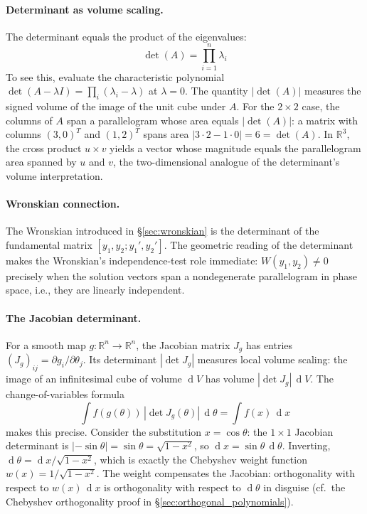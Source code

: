 \documentclass[12pt,a4paper]{report}
\DeclareMathOperator{\deriv}{d}
\theoremstyle{thms}
\theoremstyle{defns}
\begin{document}
\paragraph{Determinant as volume scaling.} The determinant equals the product of the eigenvalues:
\begin{equation}
    \det(A) = \prod_{i=1}^{n} \lambda_i
\end{equation}
To see this, evaluate the characteristic polynomial $\det(A - \lambda I) = \prod_i(\lambda_i - \lambda)$ at $\lambda = 0$. The quantity $|\det(A)|$ measures the signed volume of the image of the unit cube under $A$. For the $2 \times 2$ case, the columns of $A$ span a parallelogram whose area equals $|\det(A)|$: a matrix with columns $(3, 0)^T$ and $(1, 2)^T$ spans area $|3 \cdot 2 - 1 \cdot 0| = 6 = \det(A)$. In $\mathbb{R}^3$, the cross product $u \times v$ yields a vector whose magnitude equals the parallelogram area spanned by $u$ and $v$, the two-dimensional analogue of the determinant's volume interpretation.

\paragraph{Wronskian connection.} The Wronskian introduced in \S\ref{sec:wronskian} is the determinant of the fundamental matrix $[y_1, y_2; y_1', y_2']$. The geometric reading of the determinant makes the Wronskian's independence-test role immediate: $W(y_1, y_2) \neq 0$ precisely when the solution vectors span a nondegenerate parallelogram in phase space, i.e., they are linearly independent.

\paragraph{The Jacobian determinant.} For a smooth map $g: \mathbb{R}^n \to \mathbb{R}^n$, the Jacobian matrix $J_g$ has entries $(J_g)_{ij} = \partial g_i / \partial \theta_j$. Its determinant $|{\det J_g}|$ measures local volume scaling: the image of an infinitesimal cube of volume $\deriv V$ has volume $|{\det J_g}|\,\deriv V$. The change-of-variables formula
\begin{equation}
    \int f(g(\theta))\,|{\det J_g(\theta)}|\,\deriv\theta = \int f(x)\,\deriv x
\end{equation}
makes this precise. Consider the substitution $x = \cos\theta$: the $1 \times 1$ Jacobian determinant is $|{-\sin\theta}| = \sin\theta = \sqrt{1 - x^2}$, so $\deriv x = \sin\theta\,\deriv\theta$. Inverting, $\deriv\theta = \deriv x / \sqrt{1 - x^2}$, which is exactly the Chebyshev weight function $w(x) = 1/\sqrt{1 - x^2}$. The weight compensates the Jacobian: orthogonality with respect to $w(x)\,\deriv x$ is orthogonality with respect to $\deriv\theta$ in disguise (cf.\ the Chebyshev orthogonality proof in \S\ref{sec:orthogonal_polynomials}).
\end{document}
